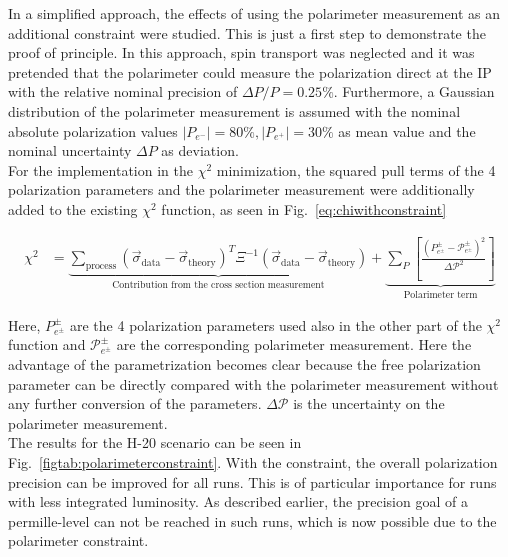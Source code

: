\documentclass[a4paper]{article}
\begin{document}
In a simplified approach, the effects of using the polarimeter measurement as an additional constraint were studied. This is just a first step to demonstrate the proof of principle. In this approach, spin transport was neglected and it was pretended that the polarimeter could measure the polarization direct at the IP with the relative nominal precision of $\Delta P/P = 0.25\%$. Furthermore, a Gaussian distribution of the polarimeter measurement is assumed with the nominal absolute polarization values $\left|P_{e^{-}}\right| = 80\%,\left|P_{e^{+}}\right| = 30\%$ as mean value and the nominal uncertainty $\Delta P$ as deviation.\\
For the implementation in the $\chi^{2}$ minimization, the squared pull terms of the 4 polarization parameters and the polarimeter measurement were additionally added to the existing $\chi^{2}$ function, as seen in Fig.~\ref{eq:chiwithconstraint}


\begin{align}
	\chi^{2} &=
	\underbrace{\sum_{\text{process}}{
	\left(\vec{\sigma}_{\text{data}} - \vec{\sigma}_{\text{theory}}\right)^{T}\Xi^{-1}
	\left(\vec{\sigma}_{\text{data}} - \vec{\sigma}_{\text{theory}}\right)
	}}_{\text{Contribution from the cross section measurement}} + \underbrace{\sum_{P}{\left[\frac{\left(P_{e^{\pm}}^{\pm} - \mathcal{P}_{e^{\pm}}^{\pm}\right)^{2}}{\Delta\mathcal{P}^{2}}\right]}}_{\text{Polarimeter term}}
\label{eq:chiwithconstraint}	
\end{align}

Here, $P_{e^{\pm}}^{\pm}$ are the 4 polarization parameters used also in the other part of the $\chi^{2}$ function and $\mathcal{P}_{e^{\pm}}^{\pm}$ are the corresponding polarimeter measurement. Here the advantage of the parametrization becomes clear because the free polarization parameter can be directly compared with the polarimeter measurement without any further conversion of the parameters. $\Delta\mathcal{P}$ is the uncertainty on the polarimeter measurement.\\
The results for the H-20\cite{ILCrunningscenario} scenario can be seen in Fig.~\ref{figtab:polarimeterconstraint}. With the constraint, the overall polarization precision can be improved for all runs. This is of particular importance for runs with less integrated luminosity. As described earlier, the precision goal of a permille-level can not be reached in such runs, which is now possible due to the polarimeter constraint.\\
\end{document}
